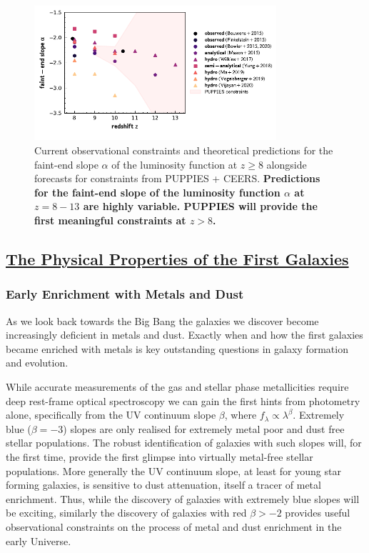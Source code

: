 \documentclass[12pt]{article}
\begin{document}
\begin{figure}[h!]
    \centering
    \includegraphics[width=0.8\textwidth]{figs/alpha.pdf}
    \vspace{-5mm}
    \caption{Current observational constraints and theoretical predictions for the faint-end slope $\alpha$ of the luminosity function at $z\ge 8$ alongside forecasts for constraints from PUPPIES + CEERS. \textbf{Predictions for the faint-end slope of the luminosity function $\alpha$ at $z=8-13$ are highly variable. PUPPIES will provide the first meaningful constraints at $z>8$.}}
    \label{fig:alpha}
\end{figure}











\subsection*{\bf \underline{The Physical Properties of the First Galaxies}}

\subsubsection*{\bf Early Enrichment with Metals and Dust}\label{sec:properties}

As we look back towards the Big Bang the galaxies we discover become increasingly deficient in metals and dust. Exactly when and how the first galaxies became enriched with metals is key outstanding questions in galaxy formation and evolution.

While accurate measurements of the gas and stellar phase metallicities require deep rest-frame optical spectroscopy we can gain the first hints from photometry alone, specifically from the UV continuum slope $\beta$,  where $f_{\lambda}\propto\lambda^{\beta}$. Extremely blue ($\beta = -3$) slopes are only realised for extremely metal poor and dust free stellar populations. The robust identification of galaxies with such slopes will, for the first time, provide the first glimpse into virtually metal-free stellar populations. More generally the UV continuum slope, at least for young star forming galaxies, is sensitive to dust attenuation, itself a tracer of metal enrichment. Thus, while the discovery of galaxies with extremely blue slopes will be exciting, similarly the discovery of galaxies with red $\beta > -2$ provides useful observational constraints on the process of metal and dust enrichment in the early Universe. 
\end{document}

